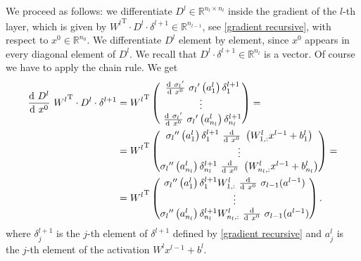 We proceed as follows: we differentiate $D^{l} \in \mathbb{R}^{n_l \times n_l}$ inside the gradient of the $l$-th layer, which is given by ${W^{l}}^{\mathrm{T}} \cdot D^{l} \cdot \delta^{l+1} \in \mathbb{R}^{n_{l-1}}$, see \cref{gradient recursive}, with respect to $x^0 \in \mathbb{R}^{n_0}$. We differentiate $D^l$ element by element, since $x^0$ appears in every diagonal element of $D^{l}$. We recall that $D^{l} \cdot \delta^{l+1} \in \mathbb{R}^{n_l}$ is a vector. Of course we have to apply the chain rule. We get
\begin{equation} 
    \label{pervert differential}
    \begin{aligned}
        \frac{\textup{d} \ D^{l}}{\textup{d} \ x^0} \  {W^{l}}^{\mathrm{T}} \cdot D^{l} \cdot \delta^{l+1} & = {W^{l}}^{\mathrm{T}} \begin{pmatrix}\ \frac{\textup{d} \ {\sigma_{l}}^{\prime}}{\textup{d} \ x^0} \  {\sigma_{l}}^{\prime} \left( a^{l}_1 \right) \delta^{l+1}_1 \\ \vdots \\ \ \frac{\textup{d} \ {\sigma_{l}}^{\prime}}{\textup{d} \ x^0} \  {\sigma_{l}}^{\prime} \left( a^{l}_{n_l} \right) \delta^{l+1}_{n_l} \end{pmatrix} = \\
        & = {W^{l}}^{\mathrm{T}} \begin{pmatrix} {\sigma_{l}}^{\prime \prime} \left( a^{l}_1 \right) \delta^{l+1}_1\ \frac{\textup{d}}{\textup{d} \ x^0} \  \left( W^{l}_{1,:} x^{l-1} + b^l_{1} \right) \\ \vdots \\ {\sigma_{l}}^{\prime \prime} \left( a^{l}_{n_l} \right) \delta^{l+1}_{n_l} \ \frac{\textup{d}}{\textup{d} \ x^0} \  \left( W^{l}_{n_l,:} x^{l-1} + b^l_{n_l} \right) \end{pmatrix} = \\
        & = {W^{l}}^{\mathrm{T}} \begin{pmatrix} {\sigma_{l}}^{\prime \prime} \left( a^{l}_1 \right) \delta^{l+1}_1 W^{l}_{1,:} \ \frac{\textup{d}}{\textup{d} \ x^0} \  \sigma_{l-1}(a^{l-1})\\ \vdots \\ {\sigma_{l}}^{\prime \prime} \left( a^{l}_{n_l} \right) \delta^{l+1}_{n_l}  W^{l}_{n_l,:} \ \frac{\textup{d}}{\textup{d} \ x^0} \  \sigma_{l-1}(a^{l-1}) \end{pmatrix}.
    \end{aligned} 
\end{equation}
where $\delta^{l+1}_j$ is the $j$-th element of $\delta^{l+1}$ defined by \cref{gradient recursive} and $a^{l}_j$ is the $j$-th element of the activation $W^l x^{l-1} + b^l$. \\
